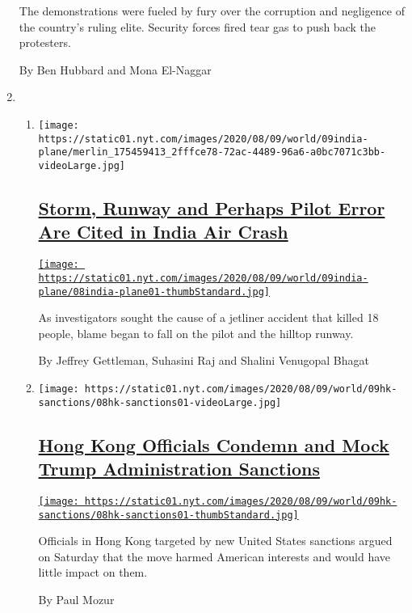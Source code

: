 \begin{enumerate}
  The demonstrations were fueled by fury over the corruption and
  negligence of the country's ruling elite. Security forces fired tear
  gas to push back the protesters.

  By Ben Hubbard and Mona El-Naggar
\item
  \begin{enumerate}
  \def\labelenumii{\arabic{enumii}.}
  \item
    \texttt{[image: https://static01.nyt.com/images/2020/08/09/world/09india-plane/merlin\_175459413\_2fffce78-72ac-4489-96a6-a0bc7071c3bb-videoLarge.jpg]}

    \hypertarget{storm-runway-and-perhaps-pilot-error-are-cited-in-india-air-crash}{%
    \subsection{\texorpdfstring{\href{/2020/08/08/world/asia/india-plane-crash-dubai.html}{Storm,
    Runway and Perhaps Pilot Error Are Cited in India Air
    Crash}}{Storm, Runway and Perhaps Pilot Error Are Cited in India Air Crash}}\label{storm-runway-and-perhaps-pilot-error-are-cited-in-india-air-crash}}

    \href{/2020/08/08/world/asia/india-plane-crash-dubai.html}{\texttt{[image: https://static01.nyt.com/images/2020/08/09/world/09india-plane/08india-plane01-thumbStandard.jpg]}}

    As investigators sought the cause of a jetliner accident that killed
    18 people, blame began to fall on the pilot and the hilltop runway.

    By Jeffrey Gettleman, Suhasini Raj and Shalini Venugopal Bhagat
  \item
    \texttt{[image: https://static01.nyt.com/images/2020/08/09/world/09hk-sanctions/08hk-sanctions01-videoLarge.jpg]}

    \hypertarget{hong-kong-officials-condemn-and-mock-trump-administration-sanctions}{%
    \subsection{\texorpdfstring{\href{/2020/08/08/world/asia/hong-kong-sanctions-united-states.html}{Hong
    Kong Officials Condemn and Mock Trump Administration
    Sanctions}}{Hong Kong Officials Condemn and Mock Trump Administration Sanctions}}\label{hong-kong-officials-condemn-and-mock-trump-administration-sanctions}}

    \href{/2020/08/08/world/asia/hong-kong-sanctions-united-states.html}{\texttt{[image: https://static01.nyt.com/images/2020/08/09/world/09hk-sanctions/08hk-sanctions01-thumbStandard.jpg]}}

    Officials in Hong Kong targeted by new United States sanctions
    argued on Saturday that the move harmed American interests and would
    have little impact on them.

    By Paul Mozur
  \end{enumerate}
\end{enumerate}

